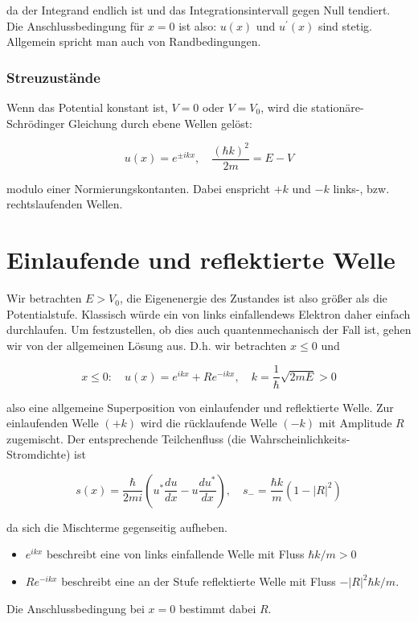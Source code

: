 \documentclass[10pt, letterpaper]{article}
\begin{document}
da der Integrand endlich ist und das Integrationsintervall gegen Null tendiert.\\
Die Anschlussbedingung für $x=0$ ist also: $u(x)$ und $u^{\prime}(x)$ sind stetig. Allgemein spricht man auch von Randbedingungen.

\subsubsection*{Streuzustände}
Wenn das Potential konstant ist, $V=0$ oder $V=V_{0}$, wird die stationäre-Schrödinger Gleichung durch ebene Wellen gelöst:

$$
u(x)=e^{ \pm i k x}, \quad \frac{(\hbar k)^{2}}{2 m}=E-V
$$

modulo einer Normierungskontanten. Dabei enspricht $+k$ und $-k$ links-, bzw. rechtslaufenden Wellen.

\section*{Einlaufende und reflektierte Welle}
Wir betrachten $E>V_{0}$, die Eigenenergie des Zustandes ist also größer als die Potentialstufe. Klassisch würde ein von links einfallendews Elektron daher einfach durchlaufen. Um festzustellen, ob dies auch quantenmechanisch der Fall ist, gehen wir von der allgemeinen Lösung aus. D.h. wir betrachten $x \leq 0$ und

$$
x \leq 0: \quad u(x)=e^{i k x}+R e^{-i k x}, \quad k=\frac{1}{\hbar} \sqrt{2 m E}>0
$$

also eine allgemeine Superposition von einlaufender und reflektierte Welle. Zur einlaufenden Welle $(+k)$ wird die rücklaufende Welle $(-k)$ mit Amplitude $R$ zugemischt. Der entsprechende Teilchenfluss (die Wahrscheinlichkeits-Stromdichte) ist

$$
s(x)=\frac{\hbar}{2 m i}\left(u^{*} \frac{d u}{d x}-u \frac{d u^{*}}{d x}\right), \quad s_{-}=\frac{\hbar k}{m}\left(1-|R|^{2}\right)
$$

da sich die Mischterme gegenseitig aufheben.

\begin{itemize}
  \item $e^{i k x}$ beschreibt eine von links einfallende Welle mit Fluss $\hbar k / m>0$
  \item $R e^{-i k x}$ beschreibt eine an der Stufe reflektierte Welle mit Fluss $-|R|^{2} \hbar k / m$.
\end{itemize}

Die Anschlussbedingung bei $x=0$ bestimmt dabei $R$.
\end{document}
